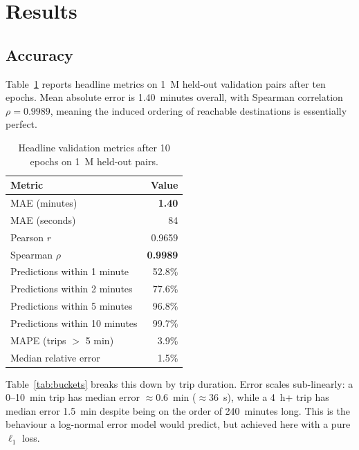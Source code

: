 \documentclass[11pt,a4paper]{article}
\begin{document}
\section{Results}
\label{sec:results}

\subsection{Accuracy}
Table~\ref{tab:headline} reports headline metrics on 1~M held-out
validation pairs after ten epochs. Mean absolute error is
1.40~minutes overall, with Spearman correlation $\rho = 0.9989$,
meaning the induced ordering of reachable destinations is essentially
perfect.

\begin{table}[h]
\centering
\caption{Headline validation metrics after 10 epochs on 1~M held-out pairs.}
\label{tab:headline}
\begin{tabular}{lr}
\toprule
Metric & Value \\
\midrule
MAE (minutes)                     & \textbf{1.40} \\
MAE (seconds)                     & 84 \\
Pearson $r$                       & 0.9659 \\
Spearman $\rho$                   & \textbf{0.9989} \\
Predictions within 1 minute       & 52.8\% \\
Predictions within 2 minutes      & 77.6\% \\
Predictions within 5 minutes      & 96.8\% \\
Predictions within 10 minutes     & 99.7\% \\
MAPE (trips $>$ 5 min)            & 3.9\% \\
Median relative error             & 1.5\% \\
\bottomrule
\end{tabular}
\end{table}

Table~\ref{tab:buckets} breaks this down by trip duration. Error
scales sub-linearly: a 0--10~min trip has median error
$\approx$0.6~min ($\approx$36~s), while a 4~h+ trip has median error
1.5~min despite being on the order of 240~minutes long. This is the
behaviour a log-normal error model would predict, but achieved here
with a pure $\ell_{1}$ loss.
\end{document}
